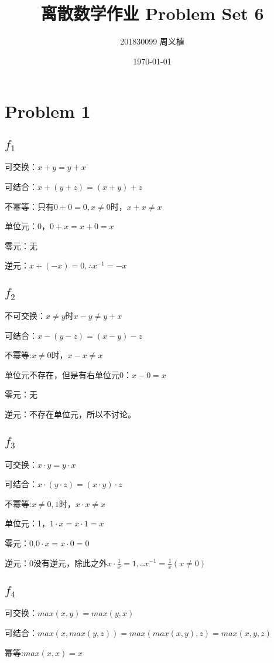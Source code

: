 \documentclass{article}
\title{离散数学作业 Problem Set 6}
\author{201830099 周义植}
\date{\today}
\begin{document}
\maketitle
\section*{Problem 1}
\subsection*{$f_1$}
可交换：$x+y=y+x$

可结合：$x+(y+z)=(x+y)+z$

不幂等：只有$0+0=0,x\neq 0$时，$x+x\neq x$

单位元：0，$0+x=x+0=x$

零元：无

逆元：$x+(-x)=0,\therefore x^{-1}=-x$

\subsection*{$f_2$}
不可交换：$x\neq y$时$x-y\neq y+x$

可结合：$x-(y-z)=(x-y)-z$

不幂等:$x\neq 0$时，$x-x\neq x$

单位元不存在，但是有右单位元0：$x-0=x$

零元：无

逆元：不存在单位元，所以不讨论。

\subsection*{$f_3$}
可交换：$x\cdot y=y\cdot x$

可结合：$x\cdot (y\cdot z)=(x\cdot y)\cdot z$

不幂等:$x\neq 0,1$时，$x\cdot x\neq x$

单位元：1，$1\cdot x=x\cdot 1 = x$

零元：0,$0\cdot x=x\cdot 0=0$

逆元：0没有逆元，除此之外$x\cdot \frac{1}{x}=1,\therefore x^{-1}=\frac{1}{x}(x\neq 0)$

\subsection*{$f_4$}
可交换：$max(x,y)=max(y,x)$

可结合：$max(x,max(y,z))=max(max(x,y),z)=max(x,y,z)$

幂等:$max(x,x)=x$
\end{document}
